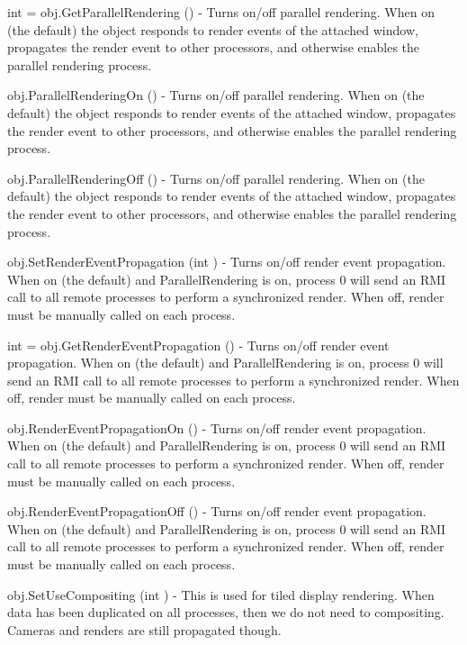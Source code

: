 \begin{DoxyItemize}
\item {\ttfamily int = obj.\-Get\-Parallel\-Rendering ()} -\/ Turns on/off parallel rendering. When on (the default) the object responds to render events of the attached window, propagates the render event to other processors, and otherwise enables the parallel rendering process.  
\item {\ttfamily obj.\-Parallel\-Rendering\-On ()} -\/ Turns on/off parallel rendering. When on (the default) the object responds to render events of the attached window, propagates the render event to other processors, and otherwise enables the parallel rendering process.  
\item {\ttfamily obj.\-Parallel\-Rendering\-Off ()} -\/ Turns on/off parallel rendering. When on (the default) the object responds to render events of the attached window, propagates the render event to other processors, and otherwise enables the parallel rendering process.  
\item {\ttfamily obj.\-Set\-Render\-Event\-Propagation (int )} -\/ Turns on/off render event propagation. When on (the default) and Parallel\-Rendering is on, process 0 will send an R\-M\-I call to all remote processes to perform a synchronized render. When off, render must be manually called on each process.  
\item {\ttfamily int = obj.\-Get\-Render\-Event\-Propagation ()} -\/ Turns on/off render event propagation. When on (the default) and Parallel\-Rendering is on, process 0 will send an R\-M\-I call to all remote processes to perform a synchronized render. When off, render must be manually called on each process.  
\item {\ttfamily obj.\-Render\-Event\-Propagation\-On ()} -\/ Turns on/off render event propagation. When on (the default) and Parallel\-Rendering is on, process 0 will send an R\-M\-I call to all remote processes to perform a synchronized render. When off, render must be manually called on each process.  
\item {\ttfamily obj.\-Render\-Event\-Propagation\-Off ()} -\/ Turns on/off render event propagation. When on (the default) and Parallel\-Rendering is on, process 0 will send an R\-M\-I call to all remote processes to perform a synchronized render. When off, render must be manually called on each process.  
\item {\ttfamily obj.\-Set\-Use\-Compositing (int )} -\/ This is used for tiled display rendering. When data has been duplicated on all processes, then we do not need to compositing. Cameras and renders are still propagated though.  

\end{DoxyItemize}

